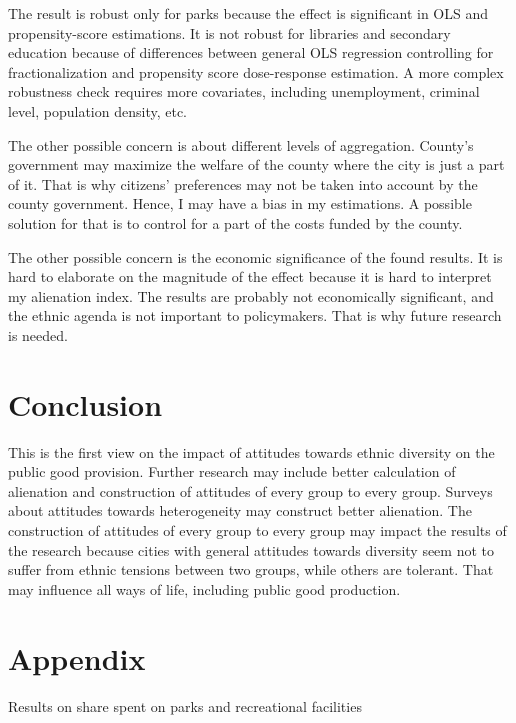 \documentclass[letterpaper,11pt]{article}
\begin{document}
The result is robust only for parks because the effect is significant in OLS and propensity-score estimations. It is not robust for libraries and secondary education because of differences between general OLS regression controlling for fractionalization and propensity score dose-response estimation. A more complex robustness check requires more covariates, including unemployment, criminal level, population density, etc.  

The other possible concern is about different levels of aggregation. County's government may maximize the welfare of the county where the city is just a part of it. That is why citizens' preferences may not be taken into account by the county government. Hence, I may have a bias in my estimations. A possible solution for that is to control for a part of the costs funded by the county.

The other possible concern is the economic significance of the found results. It is hard to elaborate on the magnitude of the effect because it is hard to interpret my alienation index. The results are probably not economically significant, and the ethnic agenda is not important to policymakers. That is why future research is needed.


\section{Conclusion}

This is the first view on the impact of attitudes towards ethnic diversity on the public good provision. Further research may include better calculation of alienation and construction of attitudes of every group to every group. Surveys about attitudes towards heterogeneity may construct better alienation. The construction of attitudes of every group to every group may impact the results of the research because cities with general attitudes towards diversity seem not to suffer from ethnic tensions between two groups, while others are tolerant. That may influence all ways of life, including public good production.

\newpage




\newpage
\section*{Appendix}

\begin{table}[h]
    \centering
    \footnotesize
  
    \caption{Results on share spent on parks and recreational facilities}
    \label{tab: parks}
\end{table}
\end{document}
